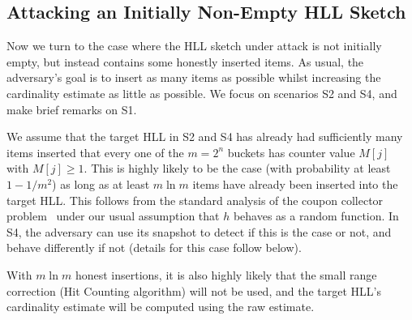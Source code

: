 \documentclass[sigconf, anonymous, dvipsnames]{acmart} %
\begin{document}
%

\subsection{Attacking an Initially Non-Empty HLL Sketch}\label{sec:nonempty}

Now we turn to the case where the HLL sketch under attack is not initially empty, but instead contains some honestly inserted items. As usual, the adversary's goal is to insert as many items as possible whilst increasing the cardinality estimate as little as possible. We focus on scenarios S2 and S4, and make brief remarks on S1.

We assume that the target HLL in S2 and S4 has already had sufficiently many items inserted that every one of the $m=2^n$ buckets has counter value $M[j]$ with $M[j] \ge 1$. This is highly likely to be the case (with probability at least $1-1/m^2$) as long as at least $m\ln m$ items have already been inserted into the target HLL. This follows from the standard analysis of the coupon collector problem~\cite[Section 3.6]{MR95} under our usual assumption that $h$ behaves as a random function.
In S4, the adversary can use its snapshot to detect if this is the case or not, and behave differently if not (details for this case follow below).

With $m \ln m$ honest insertions, it is also highly likely that the small range correction (Hit Counting algorithm) will not be used, and the target HLL's cardinality estimate will be computed using the raw estimate.

\end{document}

